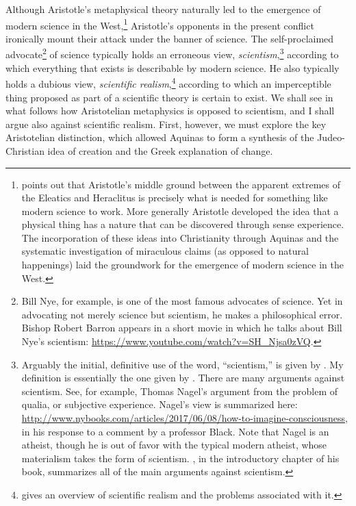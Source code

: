 \documentclass[twocolumn]{article}
\begin{document}
Although Aristotle's metaphysical theory naturally led to the emergence of
modern science in the West,\footnote{%
   \citet[Chapter 1]{f2014} points out that Aristotle's middle ground between
   the apparent extremes of the Eleatics and Heraclitus is precisely what is
   needed for something like modern science to work.  More generally Aristotle
   developed the idea that a physical thing has a nature that can be discovered
   through sense experience.  The incorporation of these ideas into
   Christianity through Aquinas and the systematic investigation of miraculous
   claims (as opposed to natural happenings) laid the groundwork for the
   emergence of modern science in the West.
}
Aristotle's opponents in the present conflict ironically mount their attack
under the banner of science.  The self-proclaimed advocate\footnote{%
   Bill Nye, for example, is one of the most famous advocates of science.  Yet
   in advocating not merely science but scientism, he makes a philosophical
   error.  Bishop Robert Barron appears in a short movie in which he talks
   about Bill Nye's scientism:
   \url{https://www.youtube.com/watch?v=SH_Njsa0zVQ}.%
}
of science typically holds an erroneous view, \emph{scientism},\footnote{%
   Arguably the initial, definitive use of the word, ``scientism,'' is given by
   \cite{s1991}.  My definition is essentially the one given by \cite{h2011}.
   There are many arguments against scientism.  See, for example, Thomas
   Nagel's argument from the problem of qualia, or subjective experience.
   Nagel's view is summarized here:
   \url{http://www.nybooks.com/articles/2017/06/08/how-to-imagine-consciousness},
   in his response to a comment by a professor Black.  Note that Nagel is an
   atheist, though he is out of favor with the typical modern atheist, whose
   materialism takes the form of scientism.  \cite{f2014}, in the introductory
   chapter of his book, summarizes all of the main arguments against
   scientism.%
}
according to which everything that exists is describable by modern science. He
also typically holds a dubious view, \emph{scientific realism},\footnote{%
   \cite{c2016} gives an overview of scientific realism and the problems
   associated with it.
}
according to which an imperceptible thing proposed as part of a scientific
theory is certain to exist.  We shall see in what follows how Aristotelian
metaphysics is opposed to scientism, and I shall argue also against scientific
realism.  First, however, we must explore the key Aristotelian distinction,
which allowed Aquinas to form a synthesis of the Judeo-Christian idea of
creation and the Greek explanation of change.
\end{document}
